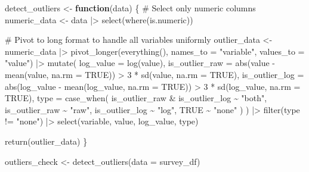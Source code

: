 \documentclass[
  letterpaper,
  DIV=11,
  numbers=noendperiod]{scrreprt}
\newenvironment{Shaded}{\begin{snugshade}}{\end{snugshade}}
\newcommand{\AttributeTok}[1]{\textcolor[rgb]{0.40,0.45,0.13}{#1}}
\newcommand{\CommentTok}[1]{\textcolor[rgb]{0.37,0.37,0.37}{#1}}
\newcommand{\ConstantTok}[1]{\textcolor[rgb]{0.56,0.35,0.01}{#1}}
\newcommand{\ControlFlowTok}[1]{\textcolor[rgb]{0.00,0.23,0.31}{\textbf{#1}}}
\newcommand{\DecValTok}[1]{\textcolor[rgb]{0.68,0.00,0.00}{#1}}
\newcommand{\FunctionTok}[1]{\textcolor[rgb]{0.28,0.35,0.67}{#1}}
\newcommand{\NormalTok}[1]{\textcolor[rgb]{0.00,0.23,0.31}{#1}}
\newcommand{\OtherTok}[1]{\textcolor[rgb]{0.00,0.23,0.31}{#1}}
\newcommand{\SpecialCharTok}[1]{\textcolor[rgb]{0.37,0.37,0.37}{#1}}
\newcommand{\StringTok}[1]{\textcolor[rgb]{0.13,0.47,0.30}{#1}}
\begin{document}
\begin{Shaded}
\begin{Highlighting}[]
\NormalTok{detect\_outliers }\OtherTok{\textless{}{-}} \ControlFlowTok{function}\NormalTok{(data) \{}
  \CommentTok{\# Select only numeric columns}
\NormalTok{  numeric\_data }\OtherTok{\textless{}{-}}\NormalTok{ data }\SpecialCharTok{|\textgreater{}}
    \FunctionTok{select}\NormalTok{(}\FunctionTok{where}\NormalTok{(is.numeric))}

  \CommentTok{\# Pivot to long format to handle all variables uniformly}
\NormalTok{  outlier\_data }\OtherTok{\textless{}{-}}\NormalTok{ numeric\_data }\SpecialCharTok{|\textgreater{}}
    \FunctionTok{pivot\_longer}\NormalTok{(}\FunctionTok{everything}\NormalTok{(), }\AttributeTok{names\_to =} \StringTok{"variable"}\NormalTok{, }\AttributeTok{values\_to =} \StringTok{"value"}\NormalTok{) }\SpecialCharTok{|\textgreater{}}
    \FunctionTok{mutate}\NormalTok{(}
      \AttributeTok{log\_value =} \FunctionTok{log}\NormalTok{(value),}
      \AttributeTok{is\_outlier\_raw =} \FunctionTok{abs}\NormalTok{(value }\SpecialCharTok{{-}} \FunctionTok{mean}\NormalTok{(value, }\AttributeTok{na.rm =} \ConstantTok{TRUE}\NormalTok{)) }\SpecialCharTok{\textgreater{}} \DecValTok{3} \SpecialCharTok{*} \FunctionTok{sd}\NormalTok{(value, }\AttributeTok{na.rm =} \ConstantTok{TRUE}\NormalTok{),}
      \AttributeTok{is\_outlier\_log =} \FunctionTok{abs}\NormalTok{(log\_value }\SpecialCharTok{{-}} \FunctionTok{mean}\NormalTok{(log\_value, }\AttributeTok{na.rm =} \ConstantTok{TRUE}\NormalTok{)) }\SpecialCharTok{\textgreater{}} \DecValTok{3} \SpecialCharTok{*} \FunctionTok{sd}\NormalTok{(log\_value, }\AttributeTok{na.rm =} \ConstantTok{TRUE}\NormalTok{),}
      \AttributeTok{type =} \FunctionTok{case\_when}\NormalTok{(}
\NormalTok{        is\_outlier\_raw }\SpecialCharTok{\&}\NormalTok{ is\_outlier\_log }\SpecialCharTok{\textasciitilde{}} \StringTok{"both"}\NormalTok{,}
\NormalTok{        is\_outlier\_raw }\SpecialCharTok{\textasciitilde{}} \StringTok{"raw"}\NormalTok{,}
\NormalTok{        is\_outlier\_log }\SpecialCharTok{\textasciitilde{}} \StringTok{"log"}\NormalTok{,}
        \ConstantTok{TRUE} \SpecialCharTok{\textasciitilde{}} \StringTok{"none"}
\NormalTok{      )}
\NormalTok{    ) }\SpecialCharTok{|\textgreater{}}
    \FunctionTok{filter}\NormalTok{(type }\SpecialCharTok{!=} \StringTok{"none"}\NormalTok{) }\SpecialCharTok{|\textgreater{}}
    \FunctionTok{select}\NormalTok{(variable, value, log\_value, type)}

  \FunctionTok{return}\NormalTok{(outlier\_data)}
\NormalTok{\}}

\NormalTok{outliers\_check }\OtherTok{\textless{}{-}} \FunctionTok{detect\_outliers}\NormalTok{(}\AttributeTok{data =}\NormalTok{ survey\_df)}
\end{Highlighting}
\end{Shaded}
\end{document}
